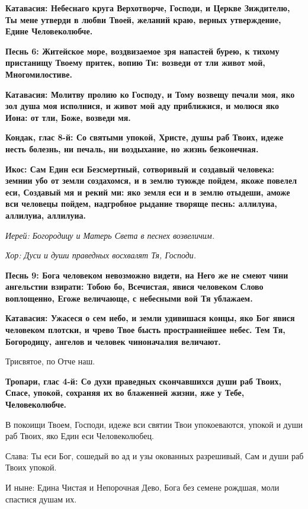 \bfseries Катавасия:\normalfont{} Небеснаго круга Верхотворче, Господи, и Церкве Зиждителю, Ты мене утверди в любви Твоей, желаний краю, верных утверждение, Едине Человеколюбче. 

\bfseries Песнь 6:\normalfont{} Житейское море, воздвизаемое зря напастей бурею, к тихому пристанищу Твоему притек, вопию Ти: возведи от тли живот мой, Многомилостиве. 

\bfseries Катавасия:\normalfont{} Молитву пролию ко Господу, и Тому возвещу печали моя, яко зол душа моя исполнися, и живот мой аду приближися, и молюся яко Иона: от тли, Боже, возведи мя. 

\bfseries Кондак, глас 8-й:\normalfont{} Со святыми упокой, Христе, душы раб Твоих, идеже несть болезнь, ни печаль, ни воздыхание, но жизнь безконечная. 

\bfseries Икос:\normalfont{} Сам Един еси Безсмертный, сотворивый и создавый человека: земнии убо от земли создахомся, и в землю туюжде пойдем, якоже повелел еси, Создавый мя и рекий ми: яко земля еси и в землю отыдеши, аможе вси человецы пойдем, надгробное рыдание творяще песнь: аллилуиа, аллилуиа, аллилуиа. 

\itshape Иерей:\normalfont{} Богородицу и Матерь Света в песнех возвеличим. 

\itshape Хор:\normalfont{} Дуси и души праведных восхвалят Тя, Господи. 

\bfseries Песнь 9:\normalfont{} Бога человеком невозможно видети, на Него же не смеют чини ангельстии взирати: Тобою бо, Всечистая, явися человеком Слово воплощенно, Егоже величающе, с небесными вой Тя ублажаем. 

\bfseries Катавасия:\normalfont{} Ужасеся о сем небо, и земли удивишася концы, яко Бог явися человеком плотски, и чрево Твое бысть пространнейшее небес. Тем Тя, Богородицу, ангелов и человек чиноначалия величают. 

Трисвятое, по Отче наш. 

\bfseries Тропари, глас 4-й:\normalfont{} Со духи праведных скончавшихся души раб Твоих, Спасе, упокой, сохраняя их во блаженней жизни, яже у Тебе, Человеколюбче. 

В покоищи Твоем, Господи, идеже вси святии Твои упокоеваются, упокой и души раб Твоих, яко Един еси Человеколюбец. 

Слава: Ты еси Бог, сошедый во ад и узы окованных разрешивый, Сам и души раб Твоих упокой. 

И ныне: Едина Чистая и Непорочная Дево, Бога без семене рождшая, моли спастися душам их. 

